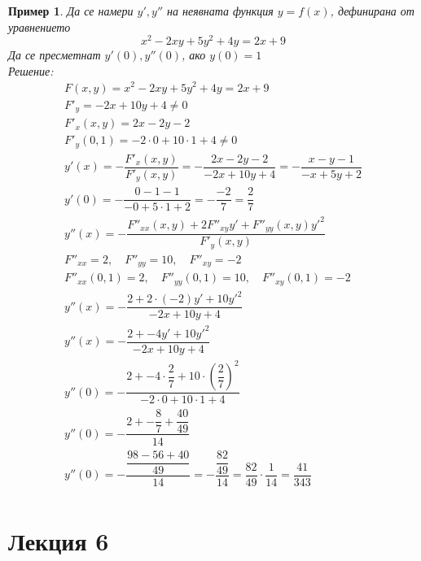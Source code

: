 \documentclass[a4paper,fleqn,12pt]{article}
\newtheorem{example}{Пример}[subsection]
\begin{document}
\begin{example}
Да се намери $y', y''$ на неявната функция $y = f(x)$, дефинирана от уравнението 
$$x^2 - 2xy + 5y^2 + 4y = 2x + 9$$
Да се пресметнат $y'(0), y''(0)$, ако $y(0) = 1$ \\
Решение: 
\begin{gather*}
F(x,y) = x^2 - 2xy + 5y^2 + 4y = 2x + 9\\
F'_y = -2x + 10y + 4 \neq 0\\
F'_x(x,y) = 2x - 2y - 2\\
F'_y(0,1) = -2 \cdot 0 + 10 \cdot 1 + 4 \neq 0\\
y'(x) = - \dfrac{F'_x(x,y)}{F'_y(x,y)} = - \dfrac{2x - 2y - 2}{-2x + 10y + 4} = - \dfrac{x - y - 1}{- x + 5y + 2}\\
y'(0) = - \dfrac{0 - 1 - 1}{- 0 + 5 \cdot 1 + 2} = - \dfrac{-2}{7} = \dfrac{2}{7}\\
y''(x) = - \dfrac{F''_{xx}(x,y) + 2F''_{xy}y' + F''_{yy}(x,y)y'^2}{F'_y(x,y)}\\
F''_{xx} = 2, \quad F''_{yy} = 10, \quad F''_{xy} = -2\\
F''_{xx}(0,1) = 2, \quad F''_{yy}(0,1) = 10, \quad F''_{xy}(0,1) = -2\\
y''(x) = - \dfrac{2 + 2 \cdot (-2)y' + 10y'^2}{-2x + 10y + 4}\\
y''(x) = - \dfrac{2 + - 4y' + 10y'^2}{-2x + 10y + 4}\\
y''(0) = - \dfrac{2 + - 4 \cdot \dfrac{2}{7} + 10 \cdot \left( \dfrac{2}{7} \right) ^2}{-2 \cdot 0 + 10 \cdot 1 + 4}\\
y''(0) = - \dfrac{2 + - \dfrac{8}{7} + \dfrac{40}{49}}{14}\\
y''(0) = - \dfrac{\dfrac{98 - 56 + 40}{49}}{14} = - \dfrac{\dfrac{82}{49}}{14} = \dfrac{82}{49} \cdot \dfrac{1}{14} = \dfrac{41}{343}\\
\end{gather*}
\end{example}

\newpage

\section{Лекция 6}
\end{document}
